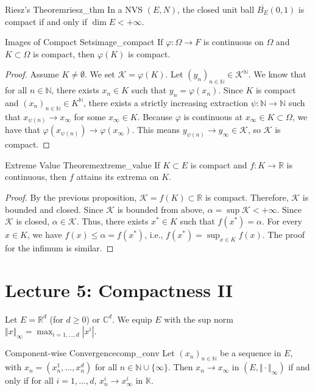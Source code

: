 \documentclass[11pt, a4paper]{article}
\newcommand{\R}{\mathbb{R}}
\newcommand{\N}{\mathbb{N}}
\newcommand{\C}{\mathbb{C}}
\begin{document}
\begin{theorem}{Riesz's Theorem}{riesz_thm}
In a NVS $(E, N)$, the closed unit ball $\overline{B_E}(0, 1)$ is compact if and only if $\dim E < +\infty$.
\end{theorem}

\begin{proposition}{Images of Compact Sets}{image_compact}
If $\varphi: \Omega \to F$ is continuous on $\Omega$ and $K \subset \Omega$ is compact, then $\varphi(K)$ is compact.
\end{proposition}
\begin{proof}
Assume $K \neq \emptyset$. We set $\mathcal{K} = \varphi(K)$.
Let $(y_n)_{n \in \N} \in \mathcal{K}^\N$. We know that for all $n \in \N$, there exists $x_n \in K$ such that $y_n = \varphi(x_n)$.
Since $K$ is compact and $(x_n)_{n \in \N} \in K^\N$, there exists a strictly increasing extraction $\psi: \N \to \N$ such that $x_{\psi(n)} \to x_\infty$ for some $x_\infty \in K$.
Because $\varphi$ is continuous at $x_\infty \in K \subset \Omega$, we have that $\varphi(x_{\psi(n)}) \to \varphi(x_\infty)$.
This means $y_{\psi(n)} \to y_\infty \in \mathcal{K}$, so $\mathcal{K}$ is compact.
\end{proof}

\begin{corollary}{Extreme Value Theorem}{extreme_value}
If $K \subset E$ is compact and $f: K \to \R$ is continuous, then $f$ attains its extrema on $K$.
\end{corollary}
\begin{proof}
By the previous proposition, $\mathcal{K} = f(K) \subset \R$ is compact.
Therefore, $\mathcal{K}$ is bounded and closed.
Since $\mathcal{K}$ is bounded from above, $\alpha = \sup \mathcal{K} < +\infty$.
Since $\mathcal{K}$ is closed, $\alpha \in \mathcal{K}$.
Thus, there exists $x^* \in K$ such that $f(x^*) = \alpha$.
For every $x \in K$, we have $f(x) \le \alpha = f(x^*)$, i.e., $f(x^*) = \sup_{x \in K} f(x)$.
The proof for the infimum is similar.
\end{proof}

\section{Lecture 5: Compactness II}
Let $E = \R^d$ (for $d \ge 0$) or $\C^d$. We equip $E$ with the sup norm $\Vert x \Vert_\infty = \max_{i=1, \dots, d} |x^i|$.

\begin{proposition}{Component-wise Convergence}{comp_conv}
Let $(x_n)_{n \in \N}$ be a sequence in $E$, with $x_n = (x_n^1, \dots, x_n^d)$ for all $n \in \N \cup \{\infty\}$.
Then $x_n \to x_\infty$ in $(E, \Vert \cdot \Vert_\infty)$ if and only if for all $i = 1, \dots, d$, $x_n^i \to x_\infty^i$ in $\mathbb{K}$.
\end{proposition}
\end{document}
